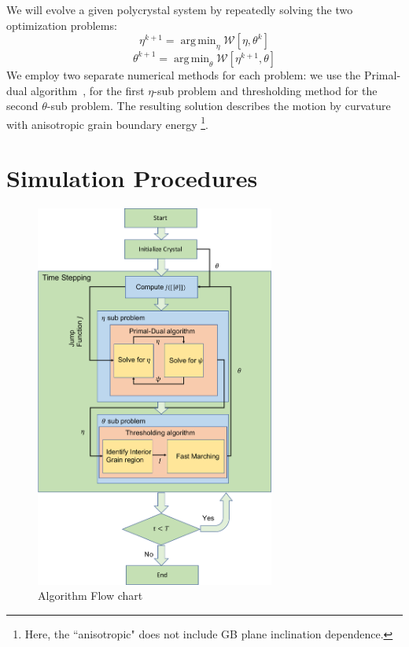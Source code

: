 \documentclass[11pt]{article}
\newcommand{\argmin}{\mathop{\mathrm{arg\,min}}}
\begin{document}
We will evolve a given polycrystal system
by repeatedly solving the two optimization problems:
\begin{equation}
\eta^{k+1}=\argmin_\eta \mathcal{W}[\eta, \theta^{k}] 
\label{eqn:eta_sub}
\end{equation}
\begin{equation}
\theta^{k+1}=\argmin_\theta  \mathcal{W}[\eta^{k+1}, \theta] 
\label{eqn:theta_sub}
\end{equation}
We employ two separate numerical methods for each problem:
we use the Primal-dual algorithm~\cite{Chambolle:2011,Jacobs:2019}, 
for the first $\eta$-sub problem and thresholding method for 
the second $\theta$-sub problem. 
The resulting solution describes the motion by curvature 
with anisotropic grain boundary energy
\footnote{
Here, the ``anisotropic" does not include GB plane inclination dependence.
}.


\section{Simulation Procedures}

\begin{figure}
\begin{center}
\includegraphics[width=0.7\textwidth]{Figures/flowChart.pdf}
\end{center}
\caption{Algorithm Flow chart}
\label{fig:flow_chart}
\end{figure}
\end{document}
